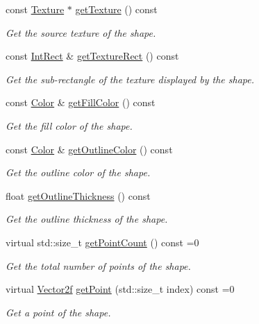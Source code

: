 \begin{DoxyCompactItemize}
const \hyperlink{classsf_1_1_texture}{Texture} $\ast$ \hyperlink{classsf_1_1_shape_a06682d37fd38d8fad56afdd5228b6951}{get\+Texture} () const
\begin{DoxyCompactList}\small\item\em Get the source texture of the shape. \end{DoxyCompactList}\item 
const \hyperlink{classsf_1_1_rect}{Int\+Rect} \& \hyperlink{classsf_1_1_shape_ac878aab03c230dc31c44e250d092b9ea}{get\+Texture\+Rect} () const
\begin{DoxyCompactList}\small\item\em Get the sub-\/rectangle of the texture displayed by the shape. \end{DoxyCompactList}\item 
const \hyperlink{classsf_1_1_color}{Color} \& \hyperlink{classsf_1_1_shape_ae3030128824e687f259d18addcf33528}{get\+Fill\+Color} () const
\begin{DoxyCompactList}\small\item\em Get the fill color of the shape. \end{DoxyCompactList}\item 
const \hyperlink{classsf_1_1_color}{Color} \& \hyperlink{classsf_1_1_shape_a6598feed5fea1325a36b0f3a615ac55c}{get\+Outline\+Color} () const
\begin{DoxyCompactList}\small\item\em Get the outline color of the shape. \end{DoxyCompactList}\item 
float \hyperlink{classsf_1_1_shape_a1d4d5299c573a905e5833fc4dce783a7}{get\+Outline\+Thickness} () const
\begin{DoxyCompactList}\small\item\em Get the outline thickness of the shape. \end{DoxyCompactList}\item 
virtual std\+::size\+\_\+t \hyperlink{classsf_1_1_shape_af988dd61a29803fc04d02198e44b5643}{get\+Point\+Count} () const =0
\begin{DoxyCompactList}\small\item\em Get the total number of points of the shape. \end{DoxyCompactList}\item 
virtual \hyperlink{classsf_1_1_vector2}{Vector2f} \hyperlink{classsf_1_1_shape_a40e5d83713eb9f0c999944cf96458085}{get\+Point} (std\+::size\+\_\+t index) const =0
\begin{DoxyCompactList}\small\item\em Get a point of the shape. \end{DoxyCompactList}\item 

\end{DoxyCompactItemize}
